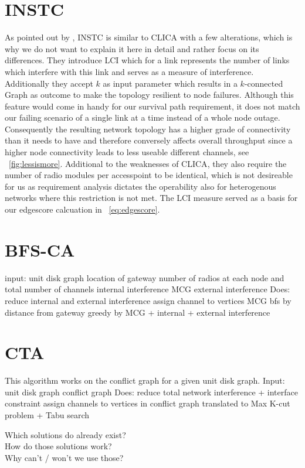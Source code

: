 \section{\ac{INSTC}}
  As pointed out by \cite{overview_caa}, INSTC \cite{INSTC} is similar to \ac{CLICA} with a few alterations, which is why we do not want to explain it here in detail and rather focus on
  its differences. They introduce \ac{LCI} which for a link represents the number of links which interfere with this link \cite{overview_caa} and serves as a measure of 
  interference. Additionally they accept \(k\) as input parameter which results in a \(k\)-connected Graph as outcome to make the topology resilient to node failures.
  Although this feature would come in handy for our survival path requirement, it does not match our failing scenario of a single link at a time instead of a whole node outage.
  Consequently the resulting network topology has a higher grade of connectivity than it needs to have and therefore conversely affects overall throughput since a higher
  node connectivity leads to less useable different channels, see ~\ref{fig:lessismore}. Additional to the weaknesses of \ac{CLICA}, they also require the number
  of radio modules per accesspoint to be identical, which is not desireable for us as requirement analysis dictates the operability also for heterogenous networks where this
  restriction is not met. The LCI measure served as a basis for our edgescore calcuation in ~\ref{eq:edgescore}.
  
\section{\ac{BFS-CA}}
  input: unit disk graph
	 location of gateway
	 number of radios at each node and total number of channels
	 internal interference MCG
	 external interference
  Does: reduce internal and external interference
	assign channel to vertices MCG
	bfs by distance from gateway
	greedy by MCG + internal + external interference
  \cite{BFS-CA}
\section{\ac{CTA}}
  This algorithm works on the conflict graph for a given unit disk graph.
  Input: unit disk graph
	 conflict graph
  Does: reduce total network interference + interface constraint
	assign channels to vertices in conflict graph
	translated to Max K-cut problem + Tabu search
  \cite{CTA}

\begin{description}
 \item [Which solutions do already exist?]
 \item[How do those solutions work?]
 \item[Why can't / won't we use those?]
\end{description}